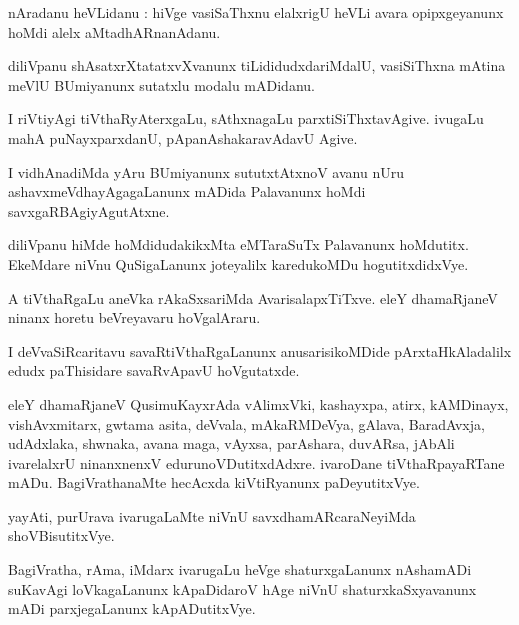 \documentclass{article}
\begin{document}
\begin{mn}
nAradanu heVLidanu : hiVge vasiSaThxnu elalxrigU heVLi avara opipxgeyanunx hoMdi alelx 
aMtadhARnanAdanu.
\end{mn}

\begin{mn}
diliVpanu shAsatxrXtatatxvXvanunx tiLididudxdariMdalU, vasiSiThxna mAtina meVlU BUmiyanunx 
sutatxlu modalu mADidanu.
\end{mn}

\begin{mn}
I riVtiyAgi tiVthaRyAterxgaLu, sAthxnagaLu parxtiSiThxtavAgive. ivugaLu mahA puNayxparxdanU, 
pApanAshakaravAdavU Agive.
\end{mn}

\begin{mn}
I vidhAnadiMda yAru BUmiyanunx sututxtAtxnoV avanu nUru ashavxmeVdhayAgagaLanunx mADida Palavanunx 
hoMdi savxgaRBAgiyAgutAtxne.
\end{mn}

\begin{mn}
diliVpanu hiMde hoMdidudakikxMta eMTaraSuTx Palavanunx hoMdutitx. EkeMdare niVnu QuSigaLanunx 
joteyalilx karedukoMDu hogutitxdidxVye.
\end{mn}

\begin{mn}
A tiVthaRgaLu aneVka rAkaSxsariMda AvarisalapxTiTxve. eleY dhamaRjaneV ninanx horetu beVreyavaru 
hoVgalAraru.
\end{mn}

\begin{mn}
I deVvaSiRcaritavu savaRtiVthaRgaLanunx anusarisikoMDide pArxtaHkAladalilx edudx paThisidare 
savaRvApavU hoVgutatxde.
\end{mn}

\begin{mn}
eleY dhamaRjaneV QusimuKayxrAda vAlimxVki, kashayxpa, atirx, kAMDinayx, vishAvxmitarx, gwtama 
asita, deVvala, mAkaRMDeVya, gAlava, BaradAvxja, udAdxlaka, shwnaka, avana maga, vAyxsa, 
parAshara, duvARsa, jAbAli ivarelalxrU ninanxnenxV edurunoVDutitxdAdxre. ivaroDane 
tiVthaRpayaRTane mADu. BagiVrathanaMte hecAcxda kiVtiRyanunx paDeyutitxVye.
\end{mn}

\begin{mn}
yayAti, purUrava ivarugaLaMte niVnU savxdhamARcaraNeyiMda shoVBisutitxVye.
\end{mn}

\begin{mn}
BagiVratha, rAma, iMdarx ivarugaLu heVge shaturxgaLanunx nAshamADi suKavAgi loVkagaLanunx 
kApaDidaroV hAge niVnU shaturxkaSxyavanunx mADi parxjegaLanunx kApADutitxVye.
\end{mn}
\end{document}
